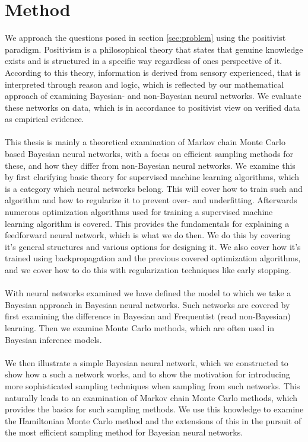 \section{Method}
We approach the questions posed in section \ref{sec:problem} using the positivist paradigm. Positivism is a philosophical theory that states that genuine knowledge exists and is structured in a specific way regardless of ones perspective of it. According to this theory, information is derived from sensory experienced, that is interpreted through reason and logic, which is reflected by our mathematical approach of examining Bayesian- and non-Bayesian neural networks. We evaluate these networks on data, which is in accordance to positivist view on verified data as empirical evidence. 
\\
\\
This thesis is mainly a theoretical examination of Markov chain Monte Carlo based Bayesian neural networks, with a focus on efficient sampling methods for these, and how they differ from non-Bayesian neural networks. We examine this by first clarifying basic theory for supervised machine learning algorithms, which is a category which neural networks belong. This will cover how to train such and algorithm and how to regularize it to prevent over- and underfitting. Afterwards numerous optimization algorithms used for training a supervised machine learning algorithm is covered. This provides the fundamentals for explaining a feedforward neural network, which is what we do then. We do this by covering it's general structures and various options for designing it. We also cover how it's trained using backpropagation and the previous covered optimization algorithms, and we cover how to do this with regularization techniques like early stopping.
\\
\\
With neural networks examined we have defined the model to which we take a Bayesian approach in Bayesian neural networks. Such networks are covered by first examining the difference in Bayesian and Frequentist (read non-Bayesian) learning. Then we examine Monte Carlo methods, which are often used in Bayesian inference models.
\\
\\
We then illustrate a simple Bayesian neural network, which we constructed to show how a such a network works, and to show the motivation for introducing more sophisticated sampling techniques when sampling from such networks. This naturally leads to an examination of Markov chain Monte Carlo methods, which provides the basics for such sampling methods. We use this knowledge to examine the Hamiltonian Monte Carlo method and the extensions of this in the pursuit of the most efficient sampling method for Bayesian neural networks. 
